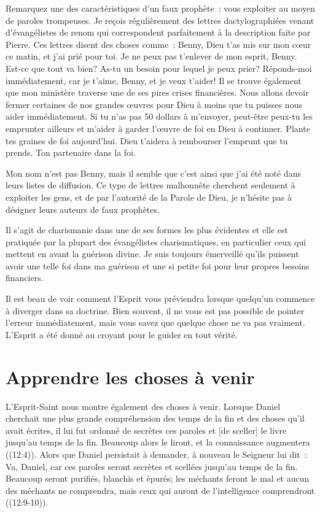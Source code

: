 Remarquez une des caractéristiques d'un faux prophète~:
 \og vous exploiter au moyen de paroles trompeuses. \fg{}
 Je reçois régulièrement des lettres dactylographiées
 venant d'évangélistes de renom qui correspondent parfaitement
 à la description faite par Pierre.
 Ces lettres disent des choses comme~:
 \og Benny, Dieu t'as mis sur mon cœur ce matin, et j'ai prié pour toi.
 Je ne peux pas t'enlever de mon esprit, Benny.
 Est-ce que tout va bien? As-tu un besoin pour lequel je peux prier?
 Réponds-moi immédiatement, car je t'aime, Benny, et je veux t'aider!
 Il se trouve également que mon ministère traverse
 une de ses pires crises financières.
 Nous allons devoir fermer certaines de nos grandes œuvres pour Dieu
 à moins que tu puisses nous aider immédiatement.
 Si tu n'as pas 50 dollars à m'envoyer, peut-être peux-tu les emprunter
 ailleurs et m'aider à garder l'œuvre de foi en Dieu à continuer.
 Plante tes graines de foi aujourd'hui.
 Dieu t'aidera à rembourser l'emprunt que tu prends.
 Ton partenaire dans la foi. \fg{}

Mon nom n'est pas Benny, mais il semble que c'est ainsi que j'ai été noté
 dans leurs listes de diffusion.
 Ce type de lettres malhonnête cherchent seulement à exploiter les gens,
 et de par l'autorité de la Parole de Dieu,
 je n'hésite pas à désigner leurs auteurs de faux prophètes.

Il s'agit de charismanie dans une de ses formes les plus évidentes
 et elle est pratiquée par la plupart des évangélistes charismatiques,
 en particulier ceux qui mettent en avant la guérison divine.
 Je suis toujours émerveillé qu'ils puissent avoir une telle foi
 dans ma guérison et une si petite foi pour leur propres besoins financiers.

Il est beau de voir comment l'Esprit vous préviendra
 lorsque quelqu'un commence à diverger dans sa doctrine.
 Bien souvent, il ne vous est pas possible de pointer l'erreur immédiatement,
 mais vous savez que quelque chose ne va pas vraiment.
 L'Esprit a été donné au croyant pour le guider en tout vérité.


\section*{Apprendre les choses à venir}

L'Esprit-Saint nous montre également des choses à venir.
 Lorsque Daniel cherchait une plus grande compréhension des temps de la fin
 et des choses qu'il avait écrites, il lui fut ordonné de
 \og [tenir] secrètes ces paroles et [de sceller] le livre
 jusqu'au temps de la fin.
 Beaucoup alors le liront, et la connaissance augmentera \fg{}
 ((12:4)).
 Alors que Daniel persistait à demander, à nouveau le Seigneur lui dit~:
 \og Va, Daniel, car ces paroles seront secrètes
 et scellées jusqu'au temps de la fin.
 Beaucoup seront purifiés, blanchis et épurés;
 les méchants feront le mal et aucun des méchants ne comprendra,
 mais ceux qui auront de l'intelligence comprendront \fg{}
 ((12:9-10)).

